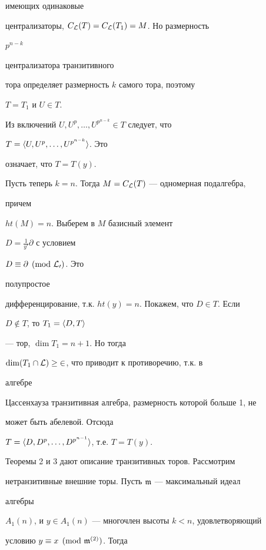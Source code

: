 \begin{pf}
имеющих одинаковые


централизаторы, $C_{\cal L}(T)=C_{\cal L}(T_1)=M$. Но размерность


$p^{n-k}$


централизатора транзитивного


тора определяет размерность $k$ самого тора, поэтому


$T=T_1$ и $U\in T$.





Из включений $U,U^p,\dotsc,U^{p^{n-k}}\in T$ следует, что


$T=\langle U,U^p,\dotsc,U^{p^{n-k}}\rangle$. Это


означает, что $T=T(y)$.





Пусть теперь $k=n$. Тогда $M=C_{\cal L}(T)$ --- одномерная подалгебра,


причем


$ht(M)=n$. Выберем в $M$ базисный элемент


$D=\frac{1}{y'}\partial$ с условием


$D\equiv\partial\pmod{\cal L_0}$. Это


полупростое


дифференцирование, т.к. $ht(y)=n$. Покажем, что $D\in T$. Если


$D\notin T$, то $T_1=\langle D,T\rangle$


--- тор, $\dim T_1=n+1$. Но тогда


$\dim(T_1\cap\cal L)\ge 2$, что приводит к противоречию, т.к. в


алгебре


Цассенхауза транзитивная алгебра, размерность которой больше 1, не


может быть абелевой. Отсюда


$T=\langle D,D^p,\dotsc,D^{p^{n-1}}\rangle$, т.е. $T=T(y)$.


\end{pf}





Теоремы 2 и 3 дают описание транзитивных торов. Рассмотрим


нетранзитивные внешние торы. Пусть $\frak m$ --- максимальный идеал


алгебры


$A_1(n)$, и $y\in A_1(n)$ --- многочлен высоты $k<n$, удовлетворяющий


условию $y\equiv x\pmod{\frak m^{(2)}}$. Тогда


